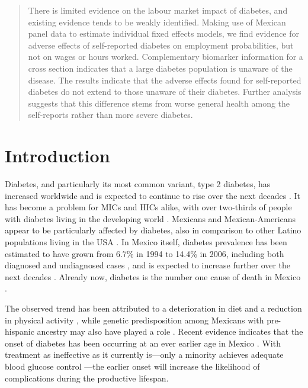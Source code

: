 
\begin{abstract}
There is limited evidence on the labour market impact of diabetes, and existing evidence tends to be weakly identified. Making use of Mexican panel data to estimate individual fixed effects models, we find evidence for adverse effects of self-reported diabetes on employment probabilities, but not on wages or hours worked. Complementary biomarker information for a cross section indicates that a large diabetes population is unaware of the disease. The results indicate that the adverse effects found for self-reported diabetes do not extend to those unaware of their diabetes. Further analysis suggests that this difference stems from worse general health among the self-reports rather than more severe diabetes.
\end{abstract}



\section{\label{sec:Introduction4}Introduction }

Diabetes, and particularly its most common variant, type 2 diabetes, has increased worldwide and is expected to continue to rise over the next decades \parencite{Risk2016}. It has become a problem for \acfp{MIC} and \acfp{HIC} alike, with over two-thirds of people with diabetes living in the developing world \parencite{InternationalDiabetesFederation2013}. Mexicans and Mexican-Americans appear to be particularly affected by diabetes, also in comparison to other Latino populations living in the USA \parencite{Schneiderman2014}. In Mexico itself, diabetes prevalence has been estimated to have grown from 6.7\% in 1994 to 14.4\% in 2006, including both diagnosed and undiagnosed cases \parencite{Barquera2013}, and is expected to increase further over the next decades \parencite{Meza2015}. Already now, diabetes is the number one cause of death in Mexico \parencite{Barquera2013}. 

The observed trend has been attributed to a deterioration in diet and a reduction in physical activity \parencite{Barquera2008b,Basu2013}, while genetic predisposition among Mexicans with pre-hispanic ancestry may also have played a role \parencite{Williams2013}. Recent evidence indicates that the onset of diabetes has been occurring at an ever earlier age in Mexico \parencite{Villalpando2010}. With treatment as ineffective as it currently is---only a minority achieves adequate blood glucose control \parencite{Barquera2013}---the earlier onset will increase the likelihood of complications during the productive lifespan. 

